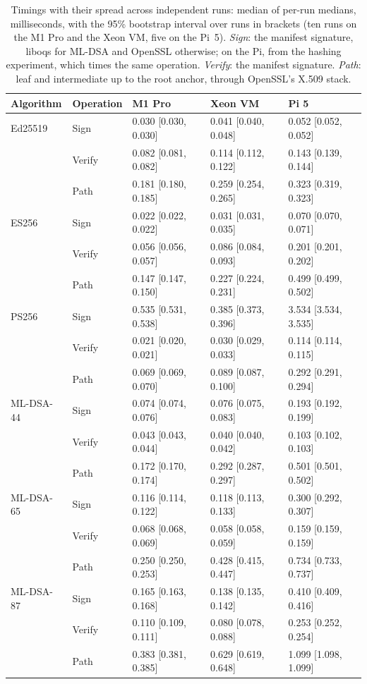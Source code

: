 \begin{table}[ht]
\caption{Timings with their spread across independent runs: median of per-run medians, milliseconds, with the 95\% bootstrap interval over runs in brackets (ten runs on the M1 Pro and the Xeon VM, five on the Pi~5). \emph{Sign}: the manifest signature, liboqs for ML-DSA and OpenSSL otherwise; on the Pi, from the hashing experiment, which times the same operation. \emph{Verify}: the manifest signature. \emph{Path}: leaf and intermediate up to the root anchor, through OpenSSL's X.509 stack.}
\label{tab:ci}
\footnotesize
\setlength{\tabcolsep}{3pt}
\begin{tabular}{lllll}
\toprule
Algorithm & Operation & M1 Pro & Xeon VM & Pi 5\\
\midrule
Ed25519 & Sign & 0.030 [0.030, 0.030] & 0.041 [0.040, 0.048] & 0.052 [0.052, 0.052]\\
 & Verify & 0.082 [0.081, 0.082] & 0.114 [0.112, 0.122] & 0.143 [0.139, 0.144]\\
 & Path & 0.181 [0.180, 0.185] & 0.259 [0.254, 0.265] & 0.323 [0.319, 0.323]\\
\addlinespace
ES256 & Sign & 0.022 [0.022, 0.022] & 0.031 [0.031, 0.035] & 0.070 [0.070, 0.071]\\
 & Verify & 0.056 [0.056, 0.057] & 0.086 [0.084, 0.093] & 0.201 [0.201, 0.202]\\
 & Path & 0.147 [0.147, 0.150] & 0.227 [0.224, 0.231] & 0.499 [0.499, 0.502]\\
\addlinespace
PS256 & Sign & 0.535 [0.531, 0.538] & 0.385 [0.373, 0.396] & 3.534 [3.534, 3.535]\\
 & Verify & 0.021 [0.020, 0.021] & 0.030 [0.029, 0.033] & 0.114 [0.114, 0.115]\\
 & Path & 0.069 [0.069, 0.070] & 0.089 [0.087, 0.100] & 0.292 [0.291, 0.294]\\
\addlinespace
ML-DSA-44 & Sign & 0.074 [0.074, 0.076] & 0.076 [0.075, 0.083] & 0.193 [0.192, 0.199]\\
 & Verify & 0.043 [0.043, 0.044] & 0.040 [0.040, 0.042] & 0.103 [0.102, 0.103]\\
 & Path & 0.172 [0.170, 0.174] & 0.292 [0.287, 0.297] & 0.501 [0.501, 0.502]\\
\addlinespace
ML-DSA-65 & Sign & 0.116 [0.114, 0.122] & 0.118 [0.113, 0.133] & 0.300 [0.292, 0.307]\\
 & Verify & 0.068 [0.068, 0.069] & 0.058 [0.058, 0.059] & 0.159 [0.159, 0.159]\\
 & Path & 0.250 [0.250, 0.253] & 0.428 [0.415, 0.447] & 0.734 [0.733, 0.737]\\
\addlinespace
ML-DSA-87 & Sign & 0.165 [0.163, 0.168] & 0.138 [0.135, 0.142] & 0.410 [0.409, 0.416]\\
 & Verify & 0.110 [0.109, 0.111] & 0.080 [0.078, 0.088] & 0.253 [0.252, 0.254]\\
 & Path & 0.383 [0.381, 0.385] & 0.629 [0.619, 0.648] & 1.099 [1.098, 1.099]\\
\bottomrule
\end{tabular}
\end{table}
